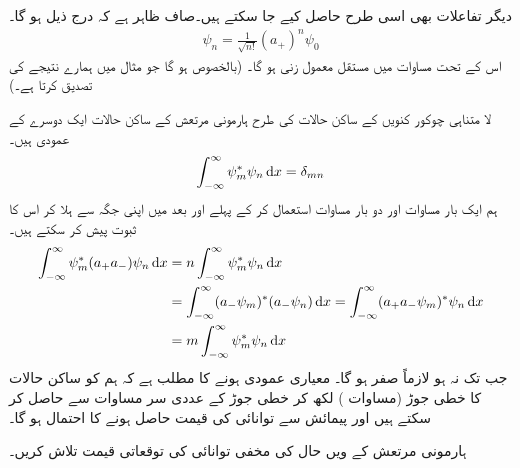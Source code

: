 دیگر تفاعلات بھی اسی طرح حاصل کیے جا سکتے ہیں۔صاف ظاہر ہے کہ درج ذیل ہو گا۔ 
\begin{align}\label{مساوات_شروڈنگر_ہارمونی_ساکن_حالات}
\psi_n = \frac{1}{ \sqrt{n!} } ( a_+ )^n \psi_0
\end{align}
اس کے تحت مساوات  میں مستقل معمول زنی  ہو گا۔ (بالخصوص  ہو گا جو مثال  میں ہمارے نتیجے کی تصدیق کرتا ہے۔)
 
لا متناہی چوکور کنویں کے ساکن حالات کی طرح ہارمونی مرتعش کے ساکن حالات ایک دوسرے کے عمودی ہیں۔ 
\begin{align}
\int_{ - \infty }^{ \infty } \psi_m^*\psi_n \dif x = \delta_{mn}
\end{align}
ہم ایک بار مساوات  اور دو بار مساوات  استعمال کر کے پہلے  اور بعد میں  اپنی جگہ سے ہلا کر اس کا ثبوت پیش کر سکتے ہیں۔
\begin{align*}
\int_{ - \infty }^{ \infty } \psi_m^*(a_+ a_- )\psi_n \dif x &= n \int_{ - \infty }^{ \infty } \psi_m^* \psi_n \dif x
\\
&=\int_{ - \infty }^{ \infty } ( a_- \psi_m )^*( a_- \psi_n ) \dif x = \int_{ - \infty }^{ \infty } ( a_+ a_- \psi_m)^* \psi_n \dif x\\
&= m \int_{ - \infty }^{ \infty } \psi_m^* \psi_n \dif x
\end{align*}
جب تک  نہ ہو  لازماً صفر ہو گا۔ معیاری عمودی ہونے کا مطلب ہے کہ ہم 
 کو ساکن حالات کا خطی جوڑ (مساوات ) لکھ کر خطی جوڑ کے عددی سر مساوات  سے حاصل کر سکتے ہیں اور پیمائش سے توانائی کی قیمت  حاصل ہونے کا احتمال  ہو گا۔

ہارمونی مرتعش کے  ویں حال کی مخفی توانائی کی توقعاتی قیمت تلاش کریں۔

